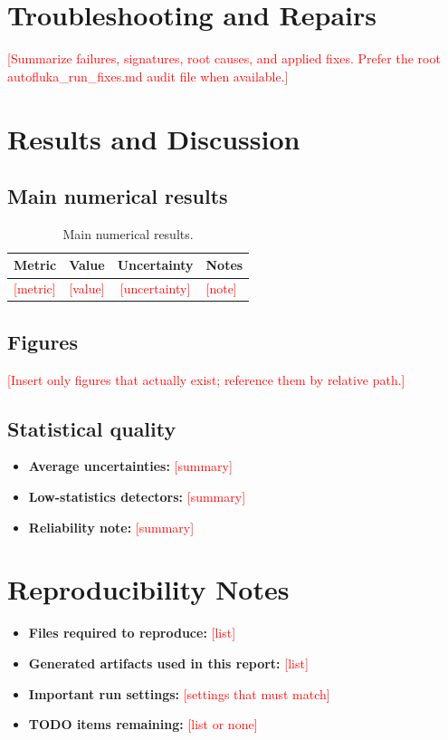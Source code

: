 \documentclass[11pt]{article}
\newcommand{\placeholder}[1]{\textcolor{red}{[#1]}}
\begin{document}
\section{Troubleshooting and Repairs}
\label{sec:troubleshooting}
\placeholder{Summarize failures, signatures, root causes, and applied fixes. Prefer the root autofluka_run_fixes.md audit file when available.}

\section{Results and Discussion}
\label{sec:results}

\subsection{Main numerical results}
\begin{table}[H]
\centering
\caption{Main numerical results.}
\label{tab:main_results}
\begin{tabularx}{\textwidth}{l c c Y}
\toprule
\textbf{Metric} & \textbf{Value} & \textbf{Uncertainty} & \textbf{Notes} \\
\midrule
\placeholder{metric} & \placeholder{value} & \placeholder{uncertainty} & \placeholder{note} \\
\bottomrule
\end{tabularx}
\end{table}

\subsection{Figures}
\placeholder{Insert only figures that actually exist; reference them by relative path.}

\subsection{Statistical quality}
\begin{itemize}[leftmargin=1.5em]
  \item \textbf{Average uncertainties:} \placeholder{summary}
  \item \textbf{Low-statistics detectors:} \placeholder{summary}
  \item \textbf{Reliability note:} \placeholder{summary}
\end{itemize}

\section{Reproducibility Notes}
\label{sec:repro}
\begin{itemize}[leftmargin=1.5em]
  \item \textbf{Files required to reproduce:} \placeholder{list}
  \item \textbf{Generated artifacts used in this report:} \placeholder{list}
  \item \textbf{Important run settings:} \placeholder{settings that must match}
  \item \textbf{TODO items remaining:} \placeholder{list or none}
\end{itemize}
\end{document}
